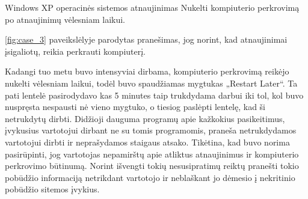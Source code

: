 ﻿\begin{xcase}{Windows XP operacinės sistemos atnaujinimas}
  \xcgoal
  {
    Nukelti kompiuterio perkrovimą po atnaujinimų vėlesniam laikui.
  }
  \xctools
  {
    \ref{fig:case_3} paveikslėlyje parodytas pranešimas, jog norint, kad atnaujinimai įsigaliotų, 
    reikia perkrauti kompiuterį.

  }
  \xcresult
  {
    Kadangi tuo metu buvo intensyviai dirbama, kompiuterio perkrovimą reikėjo nukelti vėlesniam 
    laikui, todėl buvo spaudžiamas mygtukas „Restart Later“. Ta pati lentelė pasirodydavo kas 5 
    minutes taip trukdydama darbui iki tol, kol buvo nuspręsta nespausti nė vieno mygtuko, o 
    tiesiog paslėpti lentelę, kad ši netrukdytų dirbti.
  }
  \xcprinciples
  {
    {
      Didžioji dauguma programų apie kažkokius pasikeitimus, įvykusius vartotojui dirbant ne su 
      tomis programomis, praneša netrukdydamos vartotojui dirbti ir neprašydamos staigaus atsako.
    }
  }
  \xcthoughts
  {
    Tikėtina, kad buvo norima pasirūpinti, jog vartotojas nepamirštų apie atliktus atnaujinimus 
    ir kompiuterio perkrovimo būtinumą. Norint išvengti tokių nesusipratimų reiktų pranešti 
    tokio pobūdžio informaciją netrikdant vartotojo ir neblaškant jo dėmesio į nekritinio
    pobūdžio sitemos įvykius.
  }
\end{xcase}

